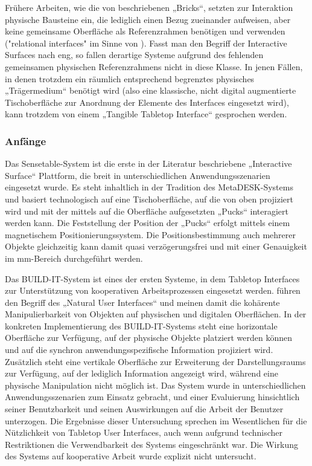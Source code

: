 Frühere Arbeiten, wie die von \citet{Fitzmaurice96} beschriebenen „Bricks“, setzten zur Interaktion physische Bausteine ein, die lediglich einen Bezug zueinander aufweisen, aber keine gemeinsame Oberfläche als Referenzrahmen benötigen und verwenden ("relational interfaces" im Sinne von \citet{Ullmer00}). Fasst man den Begriff der Interactive Surfaces nach \citet{Ishii97} eng, so fallen derartige Systeme aufgrund des fehlenden gemeinsamen physischen Referenzrahmens nicht in diese Klasse. In jenen Fällen, in denen trotzdem ein räumlich entsprechend begrenztes physisches „Trägermedium“ benötigt wird (also eine klassische, nicht digital augmentierte Tischoberfläche zur Anordnung der Elemente des Interfaces eingesetzt wird), kann trotzdem von einem „Tangible Tabletop Interface“ gesprochen werden.

\subsubsection{Anfänge} %
\label{subs:anfaenge}

Das Sensetable-System \citep{Patten01} ist die erste in der Literatur beschriebene „Interactive Surface“ Plattform, die breit in unterschiedlichen Anwendungsszenarien eingesetzt wurde. Es steht inhaltlich in der Tradition des MetaDESK-Systems \citep{Ishii97} und basiert technologisch auf eine Tischoberfläche, auf die von oben projiziert wird und mit der mittels auf die Oberfläche aufgesetzten „Pucks“ interagiert werden kann. Die Feststellung der Position der „Pucks“ erfolgt mittels einem magnetischem Positionierungssystem. Die Positionsbestimmung auch mehrerer Objekte gleichzeitig kann damit quasi verzögerungsfrei und mit einer Genauigkeit im mm-Bereich durchgeführt werden.

Das BUILD-IT-System \citep{Fjeld01} ist eines der ersten Systeme, in dem Tabletop Interfaces zur Unterstützung von kooperativen Arbeitsprozessen eingesetzt werden. \citet{Fjeld97} führen den Begriff des „Natural User Interfaces“ und meinen damit die kohärente Manipulierbarkeit von Objekten auf physischen und digitalen Oberflächen. In der konkreten Implementierung des BUILD-IT-Systems \citep{Fjeld01} steht eine horizontale Oberfläche zur Verfügung, auf der physische Objekte platziert werden können und auf die synchron anwendungsspezifische Information projiziert wird. Zusätzlich steht eine vertikale Oberfläche zur Erweiterung der Darstellungsraums zur Verfügung, auf der lediglich Information angezeigt wird, während eine physische Manipulation nicht möglich ist. Das System wurde in unterschiedlichen Anwendungsszenarien zum Einsatz gebracht, und einer Evaluierung hinsichtlich seiner Benutzbarkeit und seinen Auswirkungen auf die Arbeit der Benutzer unterzogen. Die Ergebnisse dieser Untersuchung sprechen im Wesentlichen für die Nützlichkeit von Tabletop User Interfaces, auch wenn aufgrund technischer Restriktionen die Verwendbarkeit des Systems eingeschränkt war. Die Wirkung des Systems auf kooperative Arbeit wurde explizit nicht untersucht.  

